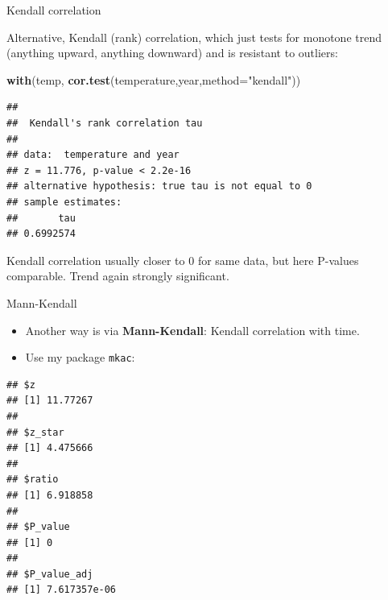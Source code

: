 \documentclass[ignorenonframetext,]{beamer}
\newenvironment{Shaded}{\begin{snugshade}}{\end{snugshade}}
\newcommand{\DataTypeTok}[1]{\textcolor[rgb]{0.13,0.29,0.53}{#1}}
\newcommand{\KeywordTok}[1]{\textcolor[rgb]{0.13,0.29,0.53}{\textbf{#1}}}
\newcommand{\NormalTok}[1]{#1}
\newcommand{\OperatorTok}[1]{\textcolor[rgb]{0.81,0.36,0.00}{\textbf{#1}}}
\newcommand{\StringTok}[1]{\textcolor[rgb]{0.31,0.60,0.02}{#1}}
\begin{document}
\begin{frame}[fragile]{Kendall correlation}
\protect\hypertarget{kendall-correlation}{}

Alternative, Kendall (rank) correlation, which just tests for monotone
trend (anything upward, anything downward) and is resistant to outliers:

\begin{Shaded}
\begin{Highlighting}[]
\KeywordTok{with}\NormalTok{(temp, }\KeywordTok{cor.test}\NormalTok{(temperature,year,}\DataTypeTok{method=}\StringTok{"kendall"}\NormalTok{))}
\end{Highlighting}
\end{Shaded}

\begin{verbatim}
## 
##  Kendall's rank correlation tau
## 
## data:  temperature and year
## z = 11.776, p-value < 2.2e-16
## alternative hypothesis: true tau is not equal to 0
## sample estimates:
##       tau 
## 0.6992574
\end{verbatim}

Kendall correlation usually closer to 0 for same data, but here P-values
comparable. Trend again strongly significant.

\end{frame}

\begin{frame}[fragile]{Mann-Kendall}
\protect\hypertarget{mann-kendall}{}

\begin{itemize}
\item
  Another way is via \textbf{Mann-Kendall}: Kendall correlation with
  time.
\item
  Use my package \texttt{mkac}:
\end{itemize}

\footnotesize

\begin{Shaded}
\end{Shaded}

\begin{verbatim}
## $z
## [1] 11.77267
## 
## $z_star
## [1] 4.475666
## 
## $ratio
## [1] 6.918858
## 
## $P_value
## [1] 0
## 
## $P_value_adj
## [1] 7.617357e-06
\end{verbatim}

\normalsize

\end{frame}
\end{document}
